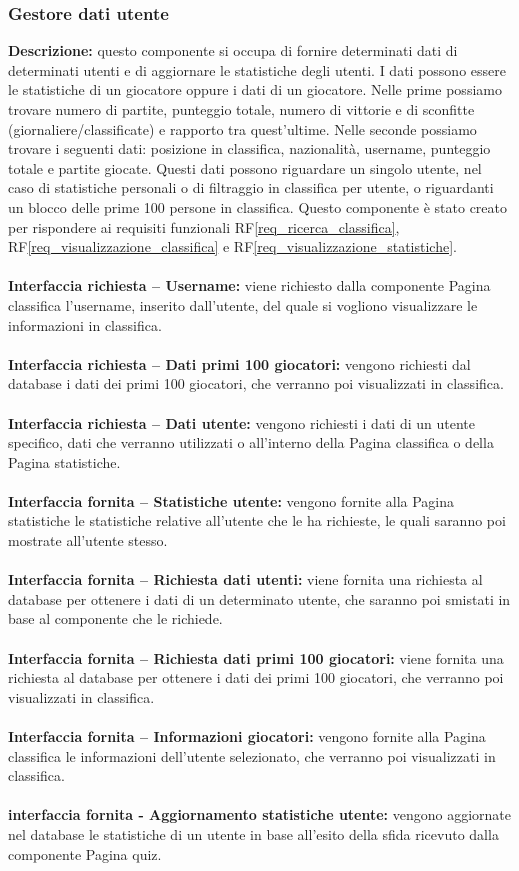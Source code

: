 \subsubsection{Gestore dati utente}
\textbf{Descrizione:} questo componente si occupa di fornire determinati dati di determinati utenti e di aggiornare le statistiche degli utenti. I dati possono essere le statistiche di un giocatore oppure i dati di un giocatore. Nelle prime possiamo trovare numero di partite, punteggio totale, numero di vittorie e di sconfitte (giornaliere/classificate) e rapporto tra quest’ultime. Nelle seconde possiamo trovare i seguenti dati: posizione in classifica, nazionalità, username, punteggio totale e partite giocate. Questi dati possono riguardare un singolo utente, nel caso di statistiche personali o di filtraggio in classifica per utente, o riguardanti un blocco delle prime 100 persone in classifica. Questo componente è stato creato per rispondere ai requisiti funzionali RF\ref{req_ricerca_classifica}, RF\ref{req_visualizzazione_classifica} e RF\ref{req_visualizzazione_statistiche}. \\
\\
\textbf{Interfaccia richiesta – Username:} viene richiesto dalla componente Pagina classifica l’username, inserito dall’utente, del quale si vogliono visualizzare le informazioni in classifica. \\
\\
\textbf{Interfaccia richiesta – Dati primi 100 giocatori:} vengono richiesti dal database i dati dei primi 100 giocatori, che verranno poi visualizzati in classifica. \\
\\
\textbf{Interfaccia richiesta – Dati utente:} vengono richiesti i dati di un utente specifico, dati che verranno utilizzati o all’interno della Pagina classifica o della Pagina statistiche. \\
\\
\textbf{Interfaccia fornita – Statistiche utente:} vengono fornite alla Pagina statistiche le statistiche relative all’utente che le ha richieste, le quali saranno poi mostrate all’utente stesso. \\
\\
\textbf{Interfaccia fornita – Richiesta dati utenti:} viene fornita una richiesta al database per ottenere i dati di un determinato utente, che saranno poi smistati in base al componente che le richiede. \\
\\
\textbf{Interfaccia fornita – Richiesta dati primi 100 giocatori:} viene fornita una richiesta al database per ottenere i dati dei primi 100 giocatori, che verranno poi visualizzati in classifica. \\
\\
\textbf{Interfaccia fornita – Informazioni giocatori:} vengono fornite alla Pagina classifica le informazioni dell’utente selezionato, che verranno poi visualizzati in classifica.\\
\\
\textbf{interfaccia fornita - Aggiornamento statistiche utente: }vengono aggiornate nel database le statistiche di un utente in base all'esito della sfida ricevuto dalla componente Pagina quiz.\\

